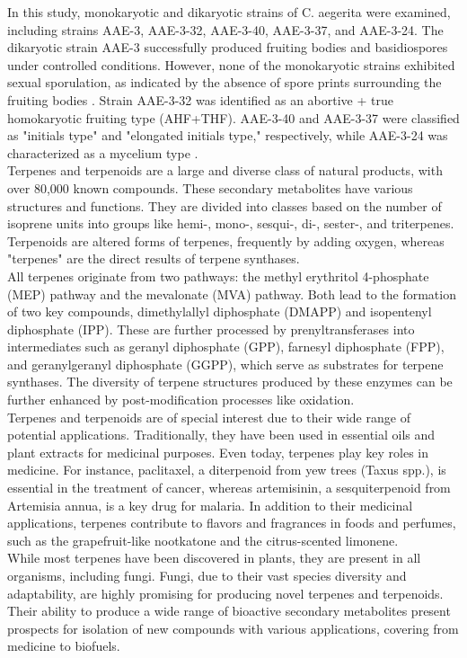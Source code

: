 In this study, monokaryotic and dikaryotic strains of C. aegerita were examined, including strains AAE-3, AAE-3-32, AAE-3-40, AAE-3-37, and AAE-3-24. The dikaryotic strain AAE-3 successfully produced fruiting bodies and basidiospores under controlled conditions. However, none of the monokaryotic strains exhibited sexual sporulation, as indicated by the absence of spore prints surrounding the fruiting bodies \cite{Orban2020}. Strain AAE-3-32 was identified as an abortive + true homokaryotic fruiting type (AHF+THF). AAE-3-40 and AAE-3-37 were classified as "initials type" and "elongated initials type," respectively, while AAE-3-24 was characterized as a mycelium type \cite{Herzog2016}.\\

Terpenes and terpenoids are a large and diverse class of natural products, with over 80,000 known compounds. These secondary metabolites have various structures and functions. They are divided into classes based on the number of isoprene units into groups like hemi-, mono-, sesqui-, di-, sester-, and triterpenes. Terpenoids are altered forms of terpenes, frequently by adding oxygen, whereas "terpenes" are the direct results of terpene synthases.\\

All terpenes originate from two pathways: the methyl erythritol 4-phosphate (MEP) pathway and the mevalonate (MVA) pathway. Both lead to the formation of two key compounds, dimethylallyl diphosphate (DMAPP) and isopentenyl diphosphate (IPP). These are further processed by prenyltransferases into intermediates such as geranyl diphosphate (GPP), farnesyl diphosphate (FPP), and geranylgeranyl diphosphate (GGPP), which serve as substrates for terpene synthases. The diversity of terpene structures produced by these enzymes can be further enhanced by post-modification processes like oxidation.\\

Terpenes and terpenoids are of special interest due to their wide range of  potential applications. Traditionally, they have been used in essential oils and plant extracts for medicinal purposes. Even today, terpenes play key roles in medicine. For instance, paclitaxel, a diterpenoid from yew trees (Taxus spp.), is essential in the treatment of cancer, whereas artemisinin, a sesquiterpenoid from Artemisia annua, is a key drug for malaria. In addition to their medicinal  applications, terpenes contribute to flavors and fragrances in foods and perfumes, such as the grapefruit-like nootkatone and the citrus-scented limonene.\\

While most terpenes have been discovered in plants, they are present in all organisms, including fungi. Fungi, due to their vast species diversity and adaptability, are highly promising for producing novel terpenes and terpenoids. Their ability to produce a wide range of bioactive secondary metabolites present prospects for isolation of new compounds with various applications, covering from medicine to biofuels.
